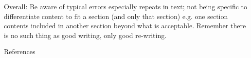 Overall: Be aware of typical errors especially repeats in text; not being specific to differentiate content to fit a section (and only that section) e.g. one section contents included in another section beyond what is acceptable.
Remember there is no such thing as good writing, only good re-writing.

References

%
%
